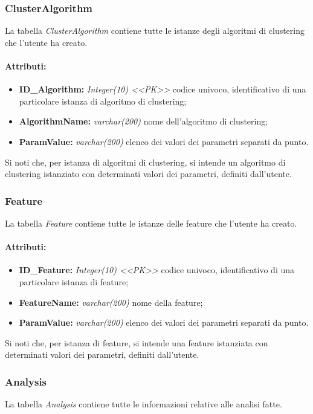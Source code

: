 \subsubsection{ClusterAlgorithm}
\label{DBCla}
La tabella \textit{ClusterAlgorithm} contiene tutte le istanze degli algoritmi di clustering\glossario{} che l'utente ha creato.
\paragraph{Attributi:}
\begin{itemize}
\item \textbf{ID\_Algorithm:} \emph{Integer(10) <<PK>>} codice univoco, identificativo di una particolare istanza di algoritmo di clustering\glossario{};
\item \textbf{AlgorithmName:} \emph{varchar(200)} nome dell'algoritmo di clustering\glossario{};
\item \textbf{ParamValue:} \emph{varchar(200)} elenco dei valori dei parametri separati da punto.
\end{itemize}
Si noti che, per istanza di algoritmi di clustering\glossario{}, si intende un algoritmo di clustering\glossario{} istanziato con determinati valori dei parametri, definiti dall'utente.

\subsubsection{Feature}
\label{DBFea}
La tabella \textit{Feature} contiene tutte le istanze delle feature\glossario{} che l'utente ha creato.
\paragraph{Attributi:}
\begin{itemize}
\item \textbf{ID\_Feature:} \emph{Integer(10) <<PK>>} codice univoco, identificativo di una particolare istanza di feature\glossario{};
\item \textbf{FeatureName:} \emph{varchar(200)} nome della feature\glossario{};
\item \textbf{ParamValue:} \emph{varchar(200)} elenco dei valori dei parametri separati da punto.
\end{itemize}
Si noti che, per istanza di feature\glossario{}, si intende una feature\glossario{} istanziata con determinati valori dei parametri, definiti dall'utente.

\subsubsection{Analysis}
\label{DBAn}
La tabella \textit{Analysis} contiene tutte le informazioni relative alle analisi fatte.

